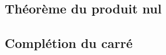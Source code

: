 \documentclass[a4paper,12pt]{article}
\begin{document}
\subsection{Théorème du produit nul}
\subsection{Complétion du carré}
\end{document}
